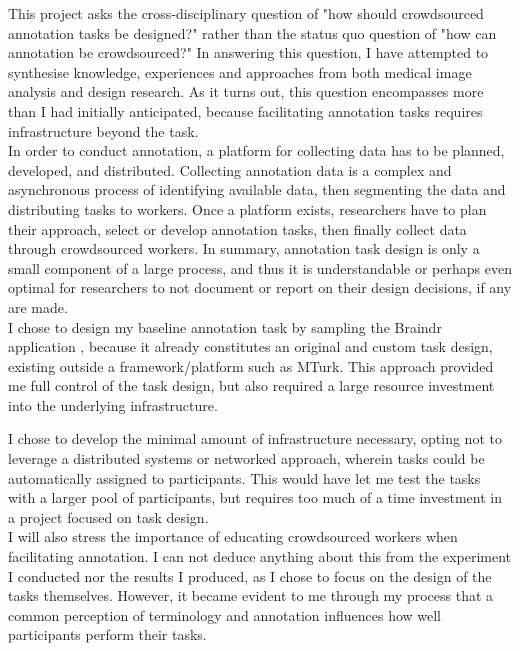\documentclass[../report.tex]{subfiles}
\begin{document}
This project asks the cross-disciplinary question of "how should crowdsourced annotation tasks be designed?" rather than the status quo question of "how can annotation be crowdsourced?" In answering this question, I have attempted to synthesise knowledge, experiences and approaches from both medical image analysis and design research. As it turns out, this question encompasses more than I had initially anticipated, because facilitating annotation tasks requires infrastructure beyond the task. \\

In order to conduct annotation, a platform for collecting data has to be planned, developed, and distributed. Collecting annotation data is a complex and asynchronous process of identifying available data, then segmenting the data and distributing tasks to workers. Once a platform exists, researchers have to plan their approach, select or develop annotation tasks, then finally collect data through crowdsourced workers. In summary, annotation task design is only a small component of a large process, and thus it is understandable or perhaps even optimal for researchers to not document or report on their design decisions, if any are made. \\

I chose to design my baseline annotation task by sampling the Braindr application \cite{Braindr}, because it already constitutes an original and custom task design, existing outside a framework/platform such as MTurk. This approach provided me full control of the task design, but also required a large resource investment into the underlying infrastructure.

I chose to develop the minimal amount of infrastructure necessary, opting not to leverage a distributed systems or networked approach, wherein tasks could be automatically assigned to participants. This would have let me test the tasks with a larger pool of participants, but requires too much of a time investment in a project focused on task design. \\

I will also stress the importance of educating crowdsourced workers when facilitating annotation. I can not deduce anything about this from the experiment I conducted nor the results I produced, as I chose to focus on the design of the tasks themselves. However, it became evident to me through my process that a common perception of terminology and annotation influences how well participants perform their tasks.
\end{document}
